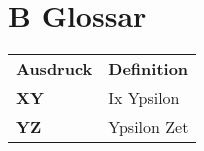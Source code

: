 %
%

\thispagestyle{empty}
\appendix
\chapter*{B Glossar}\label{chap.glossar}
\begin{table}[ht] \centering
	\begin{longtable}{m{4cm} m{11cm} }	
		\rowcolor{gray} 
		
		\textbf{Ausdruck} & \textbf{Definition} \\ 
		\textbf{XY} & Ix Ypsilon \\ 
		\textbf{YZ} & Ypsilon Zet \\ 
	
	\end{longtable}
	\label{tab:smKlassifiaktion2}
\end{table}
